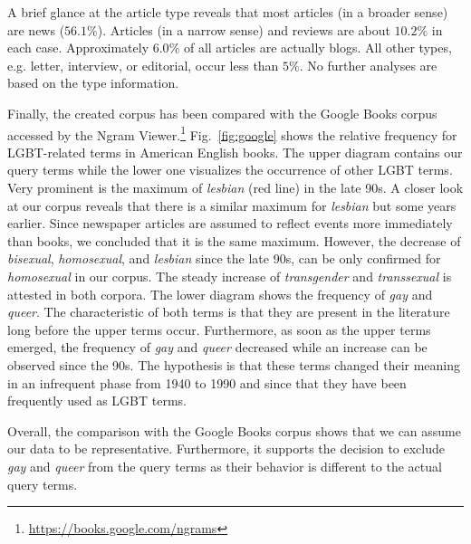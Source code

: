 \documentclass[10pt,a4paper,twocolumn]{scrartcl}
\begin{document}
A brief glance at the article type reveals that most articles (in a broader sense) are news ($56.1\%$). Articles (in a narrow sense) and reviews are about $10.2\%$ in each case. Approximately $6.0\%$ of all articles are actually blogs. All other types, e.g. letter, interview, or editorial, occur less than $5\%$. No further analyses are based on the type information.

Finally, the created corpus has been compared with the Google Books corpus accessed by the Ngram Viewer.\footnote{\url{https://books.google.com/ngrams}} Fig.~\ref{fig:google} shows the relative frequency for LGBT-related terms in American English books. The upper diagram contains our query terms while the lower one visualizes the occurrence of other LGBT terms. Very prominent is the maximum of \textit{lesbian} (red line) in the late 90s. A closer look at our corpus reveals that there is a similar maximum for \textit{lesbian} but some years earlier. Since newspaper articles are assumed to reflect events more immediately than books, we concluded that it is the same maximum. However, the decrease of \textit{bisexual}, \textit{homosexual}, and \textit{lesbian} since the late 90s, can be only confirmed for \textit{homosexual} in our corpus. The steady increase of \textit{transgender} and \textit{transsexual} is attested in both corpora. The lower diagram shows the frequency of \textit{gay} and \textit{queer}. The characteristic of both terms is that they are present in the literature long before the upper terms occur. Furthermore, as soon as the upper terms emerged, the frequency of \textit{gay} and \textit{queer} decreased while an increase can be observed since the 90s. The hypothesis is that these terms changed their meaning in an infrequent phase from 1940 to 1990 and since that they have been frequently used as LGBT terms.

Overall, the comparison with the Google Books corpus shows that we can assume our data to be representative. Furthermore, it supports the decision to exclude \textit{gay} and \textit{queer} from the query terms as their behavior is different to the actual query terms.
\end{document}
